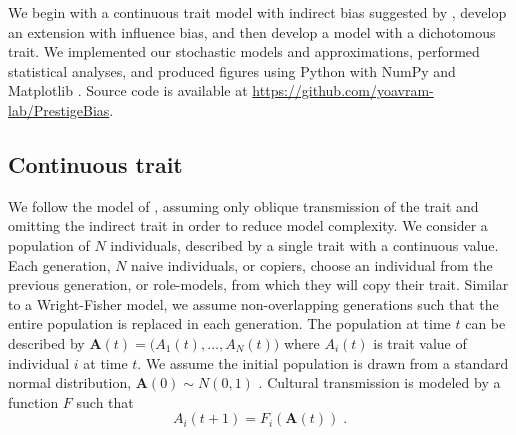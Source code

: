 \documentclass[12pt]{extarticle}
\let\vec\mathbf
\begin{document}
We begin with a continuous trait model with indirect bias suggested by \citet{evolutionBook}, develop an extension with influence bias, and then develop a model with a dichotomous trait.
We implemented our stochastic models and approximations, performed statistical analyses, and produced figures using Python \citep{python} with NumPy \citep{numpy} and Matplotlib \citep{mathplotlib}. 
Source code is available at \href{https://github.com/yoavram-lab/PrestigeBias}{https://github.com/yoavram-lab/PrestigeBias}.

\subsection*{Continuous trait}
We follow the model of \citet{evolutionBook}, assuming only oblique transmission of the trait and omitting the indirect trait in order to reduce model complexity. 
We consider a population of $N$ individuals, described by a single trait with a continuous value.
Each generation, $N$ naive individuals, or copiers, choose an individual from the previous generation, or role-models, from which they will copy their trait. Similar to a Wright-Fisher model, we assume non-overlapping generations such that the entire population is replaced in each generation.
The population at time $t$ can be described by $\vec{A}(t)=\big(A_{1}(t), \ldots, A_{N}(t)\big)$ where $A_{i}(t)$ is trait value of individual $i$ at time $t$. We assume the initial population is drawn from a standard normal distribution, $\vec{A}(0) \sim N(0,1)$ .
Cultural transmission is modeled by a function $F$ such that 
\begin{equation}\label{eq:transmission}
A_{i}(t+1) = F_i(\vec{A}(t)) \;.
\end{equation}
\end{document}
